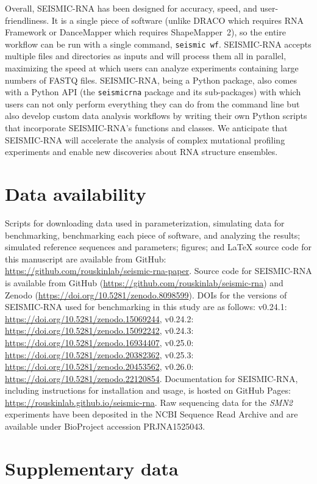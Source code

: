 \documentclass[unnumsec,webpdf,contemporary,large]{oup-authoring-template}%
\theoremstyle{thmstyleone}%
\theoremstyle{thmstyletwo}%
\theoremstyle{thmstylethree}%
\begin{document}
Overall, SEISMIC-RNA has been designed for accuracy, speed, and user-friendliness. 
It is a single piece of software (unlike DRACO which requires RNA Framework or DanceMapper which requires ShapeMapper~2), so the entire workflow can be run with a single command, \verb|seismic wf|.
SEISMIC-RNA accepts multiple files and directories as inputs and will process them all in parallel, maximizing the speed at which users can analyze experiments containing large numbers of FASTQ files.
SEISMIC-RNA, being a Python package, also comes with a Python API (the \verb|seismicrna| package and its sub-packages) with which users can not only perform everything they can do from the command line but also develop custom data analysis workflows by writing their own Python scripts that incorporate SEISMIC-RNA's functions and classes.
We anticipate that SEISMIC-RNA will accelerate the analysis of complex mutational profiling experiments and enable new discoveries about RNA structure ensembles.


\section{Data availability}

Scripts for downloading data used in parameterization, simulating data for benchmarking, benchmarking each piece of software, and analyzing the results; simulated reference sequences and parameters; figures; and LaTeX source code for this manuscript are available from GitHub: \url{https://github.com/rouskinlab/seismic-rna-paper}.
Source code for SEISMIC-RNA is available from GitHub (\url{https://github.com/rouskinlab/seismic-rna}) and Zenodo (\url{https://doi.org/10.5281/zenodo.8098599}).
DOIs for the versions of SEISMIC-RNA used for benchmarking in this study are as follows: v0.24.1: \url{https://doi.org/10.5281/zenodo.15069244}, v0.24.2: \url{https://doi.org/10.5281/zenodo.15092242}, v0.24.3: \url{https://doi.org/10.5281/zenodo.16934407}, v0.25.0: \url{https://doi.org/10.5281/zenodo.20382362}, v0.25.3: \url{https://doi.org/10.5281/zenodo.20453562}, v0.26.0: \url{https://doi.org/10.5281/zenodo.22120854}.
Documentation for SEISMIC-RNA, including instructions for installation and usage, is hosted on GitHub Pages: \url{https://rouskinlab.github.io/seismic-rna}.
Raw sequencing data for the \textit{SMN2} experiments have been deposited in the NCBI Sequence Read Archive and are available under BioProject accession PRJNA1525043.


\section{Supplementary data}
\end{document}
